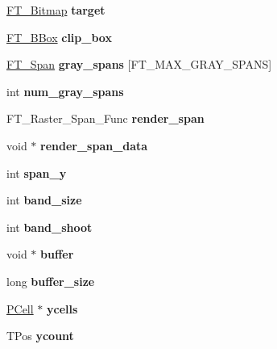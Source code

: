 \begin{DoxyCompactItemize}
\item 
\mbox{\label{structgray___t_worker___a066ff6b9701372b80eb2a16a8e85e435}} 
\hyperlink{struct_f_t___bitmap__}{F\+T\+\_\+\+Bitmap} {\bfseries target}
\item 
\mbox{\label{structgray___t_worker___a3ddc7b99c4eeca7c9688d9caa68b0675}} 
\hyperlink{struct_f_t___b_box__}{F\+T\+\_\+\+B\+Box} {\bfseries clip\+\_\+box}
\item 
\mbox{\label{structgray___t_worker___a408739c5655514786d1bcce2aed1c919}} 
\hyperlink{struct_f_t___span__}{F\+T\+\_\+\+Span} {\bfseries gray\+\_\+spans} \mbox{[}F\+T\+\_\+\+M\+A\+X\+\_\+\+G\+R\+A\+Y\+\_\+\+S\+P\+A\+NS\mbox{]}
\item 
\mbox{\label{structgray___t_worker___a877b692d1fb203a47be906d9232add02}} 
int {\bfseries num\+\_\+gray\+\_\+spans}
\item 
\mbox{\label{structgray___t_worker___a2864c17bb098262b929d7d2a80d2afda}} 
F\+T\+\_\+\+Raster\+\_\+\+Span\+\_\+\+Func {\bfseries render\+\_\+span}
\item 
\mbox{\label{structgray___t_worker___ad12de3bbfd564ac57761ba98d7dc8dab}} 
void $\ast$ {\bfseries render\+\_\+span\+\_\+data}
\item 
\mbox{\label{structgray___t_worker___a7182ee51cf117981ceac2d649b116925}} 
int {\bfseries span\+\_\+y}
\item 
\mbox{\label{structgray___t_worker___a692cb8397d3cbf44cf8369aad714cc86}} 
int {\bfseries band\+\_\+size}
\item 
\mbox{\label{structgray___t_worker___a4a1f76b0975fda3986757848aa236d19}} 
int {\bfseries band\+\_\+shoot}
\item 
\mbox{\label{structgray___t_worker___a0fd998fb3bb706e13e5e77727445bf4d}} 
void $\ast$ {\bfseries buffer}
\item 
\mbox{\label{structgray___t_worker___ac95cdbd4c8956dbca31a8dce8b6de9b8}} 
long {\bfseries buffer\+\_\+size}
\item 
\mbox{\label{structgray___t_worker___ac13e1a0a76566de7db8e8806b18c8bbe}} 
\hyperlink{struct_t_cell__}{P\+Cell} $\ast$ {\bfseries ycells}
\item 
\mbox{\label{structgray___t_worker___aaf0d8fb42dddaca073ffc4820892679a}} 
T\+Pos {\bfseries ycount}
\end{DoxyCompactItemize}


